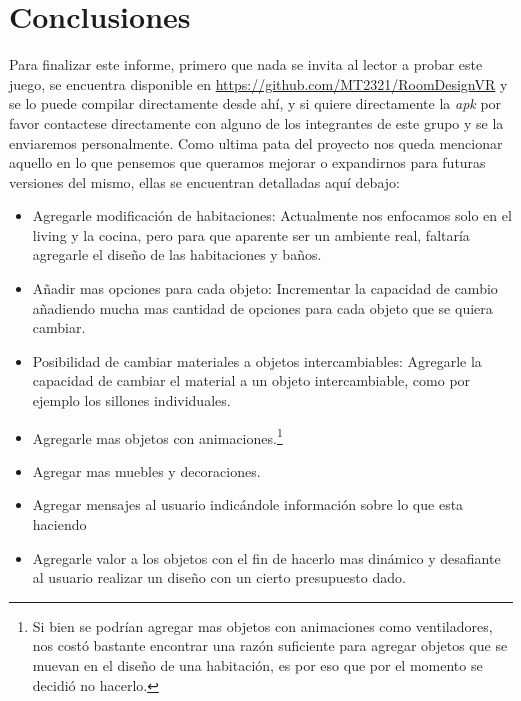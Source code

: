 \section{Conclusiones}

Para finalizar este informe, primero que nada se invita al lector a probar este juego, se encuentra disponible en \url{https://github.com/MT2321/RoomDesignVR} y se lo puede compilar directamente desde ahí, y si quiere directamente la \textit{apk} por favor contactese directamente con alguno de los integrantes de este grupo y se la enviaremos personalmente. Como ultima pata del proyecto nos queda mencionar aquello en lo que pensemos que queramos mejorar o expandirnos para futuras versiones del mismo, ellas se encuentran detalladas aquí debajo:

\begin{itemize}
    \item Agregarle modificación de habitaciones: Actualmente nos enfocamos solo en el living y la cocina, pero para que aparente ser un ambiente real, faltaría agregarle el diseño de las habitaciones y baños.
    \item Añadir mas opciones para cada objeto: Incrementar la capacidad de cambio añadiendo mucha mas cantidad de opciones para cada objeto que se quiera cambiar.
    \item Posibilidad de cambiar materiales a objetos intercambiables: Agregarle la capacidad de cambiar el material a un objeto intercambiable, como por ejemplo los sillones individuales.
    \item Agregarle mas objetos con animaciones.\footnote{Si bien se podrían agregar mas objetos con animaciones como ventiladores, nos costó bastante encontrar una razón suficiente para agregar objetos que se muevan en el diseño de una habitación, es por eso que por el momento se decidió no hacerlo.}
    \item Agregar mas muebles y decoraciones.
    \item Agregar mensajes al usuario indicándole información sobre lo que esta haciendo
    \item Agregarle valor a los objetos con el fin de hacerlo mas dinámico y desafiante al usuario realizar un diseño con un cierto presupuesto dado.
\end{itemize}